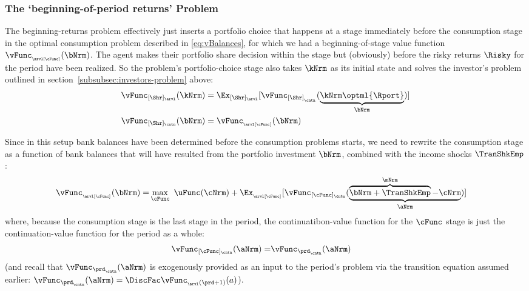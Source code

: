 \documentclass[\econtexRoot/SolvingMicroDSOPs]{subfiles}
\begin{document}
\hypertarget{beginning-returns}{}
\subsubsection{The `beginning-of-period returns' Problem}\label{subsubsec:beginning-returns}
The beginning-returns problem effectively just inserts a portfolio choice that happens at a {stage} immediately before the consumption {stage} in the optimal consumption problem described in \eqref{eq:vBalances}, for which we had a beginning-of-{stage} value function $\vFunc_{_\arvl[\cFunc]}(\bNrm)$.  The agent makes their portfolio share decision within the {stage} but (obviously) before the risky returns $\Risky$ for the {period} have been realized.  So the problem's portfolio-choice {stage} also takes $\kNrm$ as its initial state and solves the investor's problem outlined in section~\ref{subsubsec:investors-problem} above:
\begin{equation}\begin{gathered}\begin{aligned}
  \vFunc_{[\Shr]_\arvl}(\kNrm) & = \Ex_{[\Shr]_\arvl}[\vFunc_{[\Shr]_{_\cntn}}(\underbrace{\kNrm\optml{\Rport}}_{\bNrm})]
\\\vFunc_{[\Shr]_\cntn}(\bNrm)  & = \vFunc_{_\arvl[\cFunc]}(\bNrm)
    \end{aligned}\end{gathered}\end{equation}

Since in this setup bank balances have been determined before the consumption problems starts, we need to rewrite the consumption {stage}  as a function of bank balances that will have resulted from the portfolio investment $\bNrm$, combined with the income shocks $\TranShkEmp$:
\begin{equation}\begin{gathered}\begin{aligned}
      \vFunc_{_\arvl[\cFunc]}(\bNrm) = & \max_{\cFunc}~ \uFunc(\cNrm) + \Ex_{_\arvl[\cFunc]}[\vFunc_{[\cFunc]_\cntn}(\underbrace{\overbrace{\bNrm+\TranShkEmp}^{\mNrm}-\cNrm}_{\aNrm})]
    \end{aligned}\end{gathered}\end{equation}
where, because the consumption {stage} is the last {stage} in the {period}, the continuatibon-value function for the $\cFunc$ {stage} is just the continuation-value function for the period as a whole:
\begin{equation}\begin{gathered}\begin{aligned}
      \vFunc_{[\cFunc]_\cntn}(\aNrm) = & \vFunc_{\prd_\cntn}(\aNrm)
    \end{aligned}\end{gathered}\end{equation}
(and recall that $\vFunc_{\prd_\cntn}(\aNrm)$ is exogenously provided as an input to the {period}'s problem via the transition equation assumed earlier: $\vFunc_{\prd_\cntn}(\aNrm)=\DiscFac \vFunc_{_\arvl(\prd+1)}(a)$).
\end{document}
